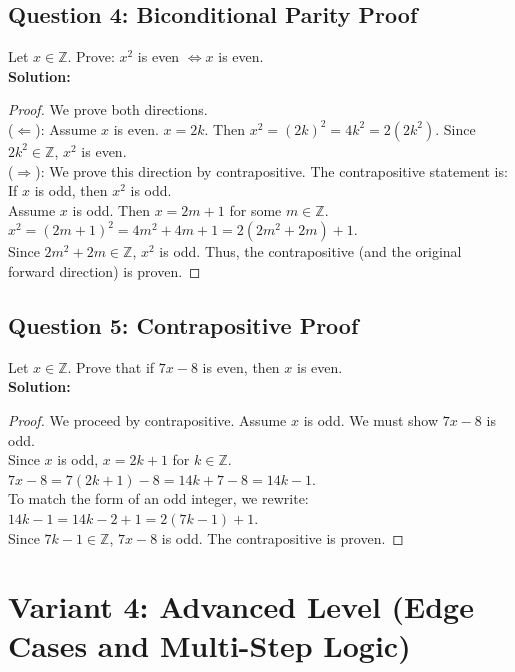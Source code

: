 \documentclass[11pt]{article}
\begin{document}
\subsection*{Question 4: Biconditional Parity Proof}
Let $x \in \mathbb{Z}$. Prove: $x^2$ is even $\Leftrightarrow x$ is even.\\
\textbf{Solution:}
\begin{proof}
We prove both directions. \\
($\Leftarrow$): Assume $x$ is even. $x = 2k$. Then $x^2 = (2k)^2 = 4k^2 = 2(2k^2)$. Since $2k^2 \in \mathbb{Z}$, $x^2$ is even. \\
($\Rightarrow$): We prove this direction by contrapositive. The contrapositive statement is: If $x$ is odd, then $x^2$ is odd. \\
Assume $x$ is odd. Then $x = 2m + 1$ for some $m \in \mathbb{Z}$. \\
$x^2 = (2m + 1)^2 = 4m^2 + 4m + 1 = 2(2m^2 + 2m) + 1$. \\
Since $2m^2+2m \in \mathbb{Z}$, $x^2$ is odd. Thus, the contrapositive (and the original forward direction) is proven.
\end{proof}

\subsection*{Question 5: Contrapositive Proof}
Let $x \in \mathbb{Z}$. Prove that if $7x-8$ is even, then $x$ is even.\\
\textbf{Solution:}
\begin{proof}
We proceed by contrapositive. Assume $x$ is odd. We must show $7x - 8$ is odd. \\
Since $x$ is odd, $x = 2k + 1$ for $k \in \mathbb{Z}$. \\
$7x - 8 = 7(2k + 1) - 8 = 14k + 7 - 8 = 14k - 1$. \\
To match the form of an odd integer, we rewrite: \\
$14k - 1 = 14k - 2 + 1 = 2(7k - 1) + 1$. \\
Since $7k - 1 \in \mathbb{Z}$, $7x - 8$ is odd. The contrapositive is proven.
\end{proof}

\newpage
\section{Variant 4: Advanced Level (Edge Cases and Multi-Step Logic)}
\end{document}
